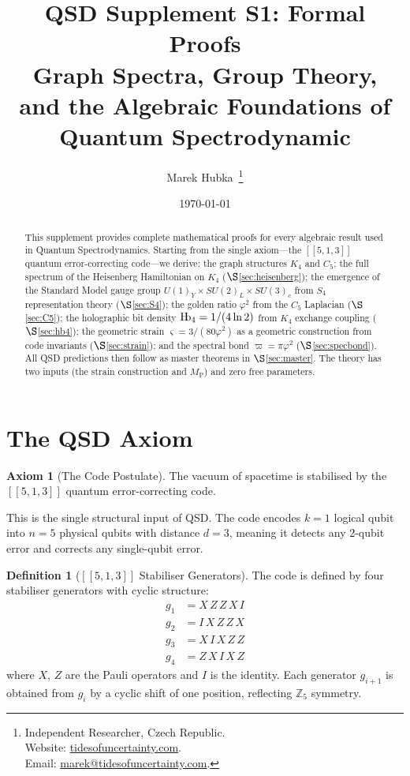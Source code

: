 \documentclass[11pt,a4paper]{article}
\title{
  \textbf{QSD Supplement S1: Formal Proofs}\\[0.5em]
  \Large Graph Spectra, Group Theory, \\ and the Algebraic Foundations of Quantum Spectrodynamic\\[1em]
}
\author{
  Marek Hubka\, \orcidlink{0009-0003-2476-9017}
  \thanks{
    Independent Researcher, Czech Republic.\\
    Website: \href{http://www.tidesofuncertainty.com}{tidesofuncertainty.com}.\\
    Email: \href{mailto:marek@tidesofuncertainty.com}{marek@tidesofuncertainty.com}.
  }
}
\date{\today}
\theoremstyle{definition}
\newtheorem{definition}[theorem]{Definition}
\newtheorem{axiom}{Axiom}
\newcommand{\Hb}{\textnormal{H\kern-0.3em b}}
\newcommand{\Hbfour}{\Hb_4}
\newcommand{\gs}{\varsigma}
\newcommand{\specbond}{\varpi}
\newcommand{\Mpl}{M_{\mathrm{P}}}
\begin{document}
\maketitle

\begin{abstract}
This supplement provides complete mathematical proofs for every algebraic result used in Quantum Spectrodynamics. Starting from the single axiom---the $[[5,1,3]]$ quantum error-correcting code---we derive: the graph structures $K_4$ and $C_5$; the full spectrum of the Heisenberg Hamiltonian on $K_4$ ($\S$\ref{sec:heisenberg}); the emergence of the Standard Model gauge group $U(1)_Y \times SU(2)_L \times SU(3)_c$ from $S_4$ representation theory ($\S$\ref{sec:S4}); the golden ratio $\varphi^2$ from the $C_5$ Laplacian ($\S$\ref{sec:C5}); the holographic bit density $\Hbfour = 1/(4\ln 2)$ from $K_4$ exchange coupling ($\S$\ref{sec:hb4}); the geometric strain $\gs = 3/(80\varphi^2)$ as a geometric construction from code invariants ($\S$\ref{sec:strain}); and the spectral bond $\specbond = \pi\varphi^2$ ($\S$\ref{sec:specbond}). All QSD predictions then follow as master theorems in $\S$\ref{sec:master}. The theory has two inputs (the strain construction and $\Mpl$) and zero free parameters.
\end{abstract}

\tableofcontents

\section{The QSD Axiom}
\label{S1:axiom}

\begin{axiom}[The Code Postulate]
\label{S1:axiom:code}
The vacuum of spacetime is stabilised by the $[[5,1,3]]$ quantum error-correcting code.
\end{axiom}

This is the single structural input of QSD. The code encodes $k = 1$ logical qubit into $n = 5$ physical qubits with distance $d = 3$, meaning it detects any 2-qubit error and corrects any single-qubit error.

\begin{definition}[{$[[5,1,3]]$ Stabiliser Generators}]
\label{S1:def:stabilisers}
The code is defined by four stabiliser generators with cyclic structure:
\begin{align}
g_1 &= X\, Z\, Z\, X\, I \label{S1:eq:g1}\\
g_2 &= I\, X\, Z\, Z\, X \label{S1:eq:g2}\\
g_3 &= X\, I\, X\, Z\, Z \label{S1:eq:g3}\\
g_4 &= Z\, X\, I\, X\, Z \label{S1:eq:g4}
\end{align}
where $X$, $Z$ are the Pauli operators and $I$ is the identity. Each generator $g_{i+1}$ is obtained from $g_i$ by a cyclic shift of one position, reflecting $\mathbb{Z}_5$ symmetry.
\end{definition}
\end{document}

